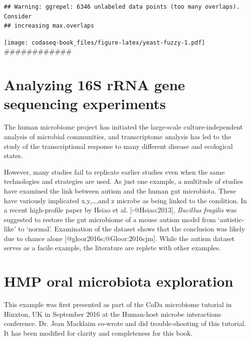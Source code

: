 \documentclass[
  onecolumn]{article}
\begin{document}
\begin{verbatim}
## Warning: ggrepel: 6346 unlabeled data points (too many overlaps). Consider
## increasing max.overlaps
\end{verbatim}

\texttt{[image: codaseq-book\_files/figure-latex/yeast-fuzzy-1.pdf]}
\#\#\#\#\#\#\#\#\#\#\#\#

\hypertarget{analyzing-16s-rrna-gene-sequencing-experiments}{%
\section{Analyzing 16S rRNA gene sequencing experiments}\label{analyzing-16s-rrna-gene-sequencing-experiments}}

The human microbiome project has initiated the large-scale culture-independent analysis of microbial communities, and transcriptome analysis has led to the study of the transcriptional response to many different disease and ecological states.

However, many studies fail to replicate earlier studies even when the same technologies and strategies are used. As just one example, a multitude of studies have examined the link between autism and the human gut microbiota. These have variously implicated x,y,\ldots,and z microbe as being linked to the condition. In a recent high-profile paper by Hsiao et al. {[}-@Hsiao:2013{]}, \emph{Bacillus fragilis} was suggested to restore the gut microbiome of a mouse autism model from `autistic-like' to `normal'. Examination of the dataset shows that the conclusion was likely due to chance alone {[}@gloor2016s;@Gloor:2016cjm{]}. While the autism dataset serves as a facile example, the literature are replete with other examples.

\hypertarget{oral}{%
\section{HMP oral microbiota exploration}\label{oral}}

\hspace{2cm}\begin{minipage}[ct]{10cm}
\parskip=5pt
\parindent=5pt
This example was first presented as part of the CoDa microbiome tutorial in Hinxton, UK in September 2016 at the Human-host microbe interactions conference. Dr. Jean Macklaim co-wrote and did trouble-shooting of this tutorial. It has been modified for clarity and completeness for this book.
\end{minipage}
\vspace{1cm}
\end{document}
